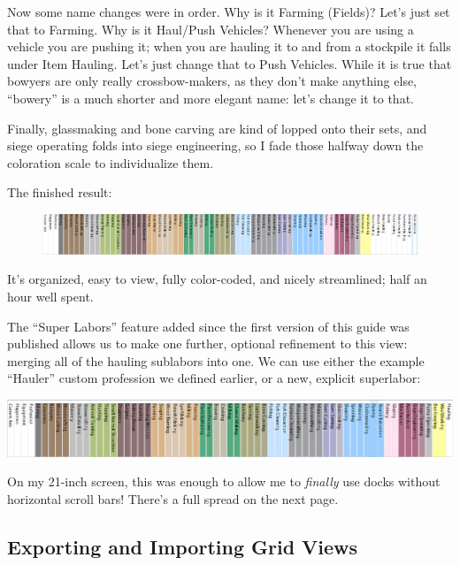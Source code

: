 \documentclass[]{article}
\newcommand{\addendum}[1] {
\begin{center}
\colorbox{addendum-content}{
\begin{minipage}[t]{0.96\linewidth}
#1
\end{minipage}
}
\end{center}
}
\begin{document}
Now some name changes were in order. Why is it Farming (Fields)? Let's just set that to Farming. Why is
it Haul/Push Vehicles? Whenever you are using a vehicle you are pushing it; when you are hauling it to
and from a stockpile it falls under Item Hauling. Let's just change that to Push Vehicles. While it is
true that bowyers are only really crossbow-makers, as they don't make anything else, ``bowery'' is a
much shorter and more elegant name: let's change it to that.
\vspace{12pt}

Finally, glassmaking and bone carving are kind of lopped onto their sets, and siege
operating folds into siege engineering, so I fade those halfway down the coloration scale to
individualize them.\vspace{12pt}

The finished result:
\begin{figure}[h!]
\centering \includegraphics[width=\linewidth]{Sec3Fig26}
\end{figure}

It's organized, easy to view, fully color-coded, and nicely streamlined; half an hour well spent.

\addendum{

The ``Super Labors'' feature added since the first version of this guide was published allows us to make
one further, optional refinement to this view: merging all of the hauling sublabors into one. We can use
either the example ``Hauler'' custom profession we defined earlier, or a new, explicit superlabor:

\includegraphics[width=\linewidth]{Sec3Fig26+}

On my 21-inch screen, this was enough to allow me to \emph{finally} use docks without horizontal
scroll bars! There's a full spread on the next page.

}

\subsection{Exporting and Importing Grid Views}
\label{sec:Exporting and Importing Grid Views}
\end{document}
